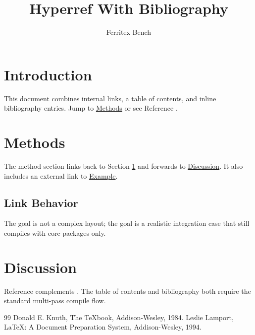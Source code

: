 \documentclass{article}
\title{Hyperref With Bibliography}
\author{Ferritex Bench}
\begin{document}
\maketitle
\tableofcontents

\section{Introduction}\label{sec:intro}
This document combines internal links, a table of contents, and inline bibliography entries. Jump to \hyperref[sec:methods]{Methods} or see Reference \cite{knuth}.

\section{Methods}\label{sec:methods}
The method section links back to Section \ref{sec:intro} and forwards to \hyperref[sec:discussion]{Discussion}. It also includes an external link to \href{https://example.com}{Example}.

\subsection{Link Behavior}
The goal is not a complex layout; the goal is a realistic integration case that still compiles with core packages only.

\section{Discussion}\label{sec:discussion}
Reference \cite{lamport} complements \cite{knuth}. The table of contents and bibliography both require the standard multi-pass compile flow.

\begin{thebibliography}{99}
 Donald E. Knuth, The TeXbook, Addison-Wesley, 1984.
 Leslie Lamport, LaTeX: A Document Preparation System, Addison-Wesley, 1994.
\end{thebibliography}
\end{document}
